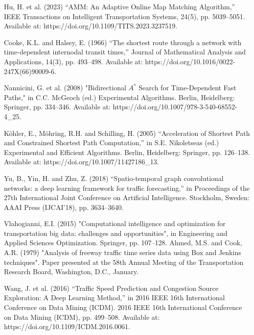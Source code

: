 \begin{thebibliography}{99}
        Hu, H. et al. (2023) “AMM: An Adaptive Online Map Matching Algorithm,” IEEE Transactions on Intelligent Transportation Systems, 24(5), pp. 5039–5051. Available at: https://doi.org/10.1109/TITS.2023.3237519.

        Cooke, K.L. and Halsey, E. (1966) “The shortest route through a network with time-dependent internodal transit times,” Journal of Mathematical Analysis and Applications, 14(3), pp. 493–498. Available at: https://doi.org/10.1016/0022-247X(66)90009-6.


        Nannicini, G. et al. (2008) "Bidirectional $A^*$ Search for Time-Dependent Fast Paths," in C.C. McGeoch (ed.) Experimental Algorithms. Berlin, Heidelberg: Springer, pp. 334–346. Available at: https://doi.org/10.1007/978-3-540-68552-4\_25.
        
        Köhler, E., Möhring, R.H. and Schilling, H. (2005) “Acceleration of Shortest Path and Constrained Shortest Path Computation,” in S.E. Nikoletseas (ed.) Experimental and Efficient Algorithms. Berlin, Heidelberg: Springer, pp. 126–138. Available at: https://doi.org/10.1007/11427186\_13.

        Yu, B., Yin, H. and Zhu, Z. (2018) “Spatio-temporal graph convolutional networks: a deep learning framework for traffic forecasting,” in Proceedings of the 27th International Joint Conference on Artificial Intelligence. Stockholm, Sweden: AAAI Press (IJCAI’18), pp. 3634–3640.

        Vlahogianni, E.I. (2015) "Computational intelligence and optimization for transportation big data: challenges and opportunities", in Engineering and Applied Sciences Optimization. Springer, pp. 107–128.        
        Ahmed, M.S. and Cook, A.R. (1979) "Analysis of freeway traffic time series data using Box and Jenkins techniques". Paper presented at the 58th Annual Meeting of the Transportation Research Board, Washington, D.C., January.


        
        Wang, J. et al. (2016) “Traffic Speed Prediction and Congestion Source Exploration: A Deep Learning Method,” in 2016 IEEE 16th International Conference on Data Mining (ICDM). 2016 IEEE 16th International Conference on Data Mining (ICDM), pp. 499–508. Available at: https://doi.org/10.1109/ICDM.2016.0061.



\end{thebibliography}
